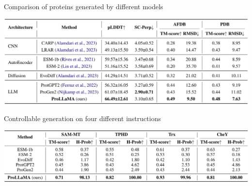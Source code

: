 \documentclass[dvipsnames]{beamer}
\begin{document}
\begin{frame}{Comparison of proteins generated by different models}
	\begin{center}
		\includegraphics[scale=0.21]{images/methods_comparison.png}
	\end{center}
\end{frame}

\begin{frame}{Controllable generation on four different instructions}
	\begin{center}
		\includegraphics[scale=0.21]{images/controlled_generation_comparison.png}
	\end{center}
\end{frame}
\end{document}
